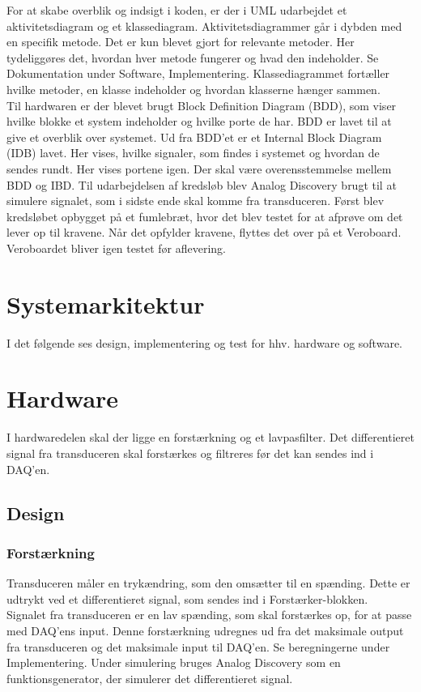 \newline 
For at skabe overblik og indsigt i koden, er der i UML udarbejdet et aktivitetsdiagram og et klassediagram. Aktivitetsdiagrammer går i dybden med en specifik metode. Det er kun blevet gjort for relevante metoder. Her tydeliggøres det, hvordan hver metode fungerer og hvad den indeholder. Se Dokumentation under Software, Implementering. Klassediagrammet fortæller hvilke metoder, en klasse indeholder og hvordan klasserne hænger sammen.\\
\newline  
Til hardwaren er der blevet brugt Block Definition Diagram (BDD), som viser hvilke blokke et system indeholder og hvilke porte de har. BDD er lavet til at give et overblik over systemet. Ud fra BDD’et er et Internal Block Diagram (IDB) lavet. Her vises, hvilke signaler, som findes i systemet og hvordan de sendes rundt. Her vises portene igen. Der skal være overensstemmelse mellem BDD og IBD.    
\newline 
Til udarbejdelsen af kredsløb blev Analog Discovery brugt til at simulere signalet, som i sidste ende skal komme fra transduceren. Først blev kredsløbet opbygget på et fumlebræt, hvor det blev testet for at afprøve om det lever op til kravene. Når det opfylder kravene, flyttes det over på et Veroboard. Veroboardet bliver igen testet før aflevering. 

\section{Systemarkitektur}
I det følgende ses design, implementering og test for hhv. hardware og software. 

\section{Hardware}
I hardwaredelen skal der ligge en forstærkning og et lavpasfilter. Det differentieret signal fra transduceren skal forstærkes og filtreres før det kan sendes ind i DAQ'en.

\subsection{Design}
\subsubsection{Forstærkning}
Transduceren måler en trykændring, som den omsætter til en spænding. Dette er udtrykt ved et differentieret signal, som sendes ind i Forstærker-blokken. \\
Signalet fra transduceren er en lav spænding, som skal forstærkes op, for at passe med DAQ'ens input. Denne forstærkning udregnes ud fra det maksimale output fra transduceren og det maksimale input til DAQ'en. Se beregningerne under Implementering.  
\newline
Under simulering bruges Analog Discovery som en funktionsgenerator, der simulerer det differentieret signal.  

